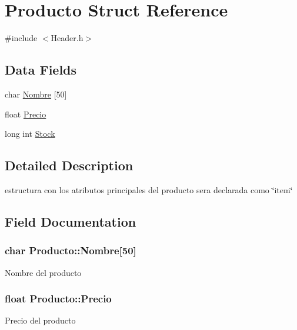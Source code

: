 \hypertarget{structProducto}{}\section{Producto Struct Reference}
\label{structProducto}


{\ttfamily \#include $<$Header.\+h$>$}

\subsection*{Data Fields}
\begin{DoxyCompactItemize}
\item 
char \hyperlink{structProducto_a1db120458b658a4eae31bcefb867b670}{Nombre} \mbox{[}50\mbox{]}
\item 
float \hyperlink{structProducto_a0db80c096b61b2fbe7a25b7947b514a8}{Precio}
\item 
long int \hyperlink{structProducto_aa97b1c641bd18ab3346430bec2ec23ed}{Stock}
\end{DoxyCompactItemize}


\subsection{Detailed Description}
estructura con los atributos principales del producto sera declarada como \char`\"{}item\char`\"{} 

\subsection{Field Documentation}
\subsubsection[{\texorpdfstring{Nombre}{Nombre}}]{\setlength{\rightskip}{0pt plus 5cm}char Producto\+::\+Nombre\mbox{[}50\mbox{]}}\hypertarget{structProducto_a1db120458b658a4eae31bcefb867b670}{}\label{structProducto_a1db120458b658a4eae31bcefb867b670}
Nombre del producto 
\subsubsection[{\texorpdfstring{Precio}{Precio}}]{\setlength{\rightskip}{0pt plus 5cm}float Producto\+::\+Precio}\hypertarget{structProducto_a0db80c096b61b2fbe7a25b7947b514a8}{}\label{structProducto_a0db80c096b61b2fbe7a25b7947b514a8}
Precio del producto 
